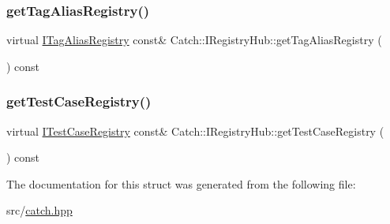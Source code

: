 \mbox{\label{struct_catch_1_1_i_registry_hub_a3c511b1d33e5a6d95c333a0ff387df1a}} 
\subsubsection{\texorpdfstring{get\+Tag\+Alias\+Registry()}{getTagAliasRegistry()}}
{\footnotesize\ttfamily virtual \hyperlink{struct_catch_1_1_i_tag_alias_registry}{I\+Tag\+Alias\+Registry} const\& Catch\+::\+I\+Registry\+Hub\+::get\+Tag\+Alias\+Registry (\begin{DoxyParamCaption}{ }\end{DoxyParamCaption}) const\hspace{0.3cm}{\ttfamily [pure virtual]}}

\mbox{\label{struct_catch_1_1_i_registry_hub_af4f6255f0c0f8f1f179fa9d7d4843076}} 
\subsubsection{\texorpdfstring{get\+Test\+Case\+Registry()}{getTestCaseRegistry()}}
{\footnotesize\ttfamily virtual \hyperlink{struct_catch_1_1_i_test_case_registry}{I\+Test\+Case\+Registry} const\& Catch\+::\+I\+Registry\+Hub\+::get\+Test\+Case\+Registry (\begin{DoxyParamCaption}{ }\end{DoxyParamCaption}) const\hspace{0.3cm}{\ttfamily [pure virtual]}}



The documentation for this struct was generated from the following file\+:\begin{DoxyCompactItemize}
\item 
src/\hyperlink{catch_8hpp}{catch.\+hpp}\end{DoxyCompactItemize}

